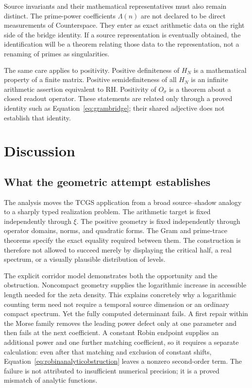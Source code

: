 \documentclass[11pt,letterpaper]{article}
\numberwithin{equation}{section}
\theoremstyle{definition}
\theoremstyle{remark}
\begin{document}
Source invariants and their mathematical representatives must also remain distinct. The prime-power coefficients $\Lambda(n)$ are not declared to be direct measurements of Counterspace. They enter as exact arithmetic data on the right side of the bridge identity. If a source representation is eventually obtained, the identification will be a theorem relating those data to the representation, not a renaming of primes as singularities.

The same care applies to positivity. Positive definiteness of $H_N$ is a mathematical property of a finite matrix. Positive semidefiniteness of all $H_N$ is an infinite arithmetic assertion equivalent to RH. Positivity of $O_\sigma$ is a theorem about a closed readout operator. These statements are related only through a proved identity such as Equation~\eqref{eq:grambridge}; their shared adjective does not establish that identity.

\section{Discussion}
\label{sec:discussion}
\subsection{What the geometric attempt establishes}
The analysis moves the TCGS application from a broad source--shadow analogy to a sharply typed realization problem. The arithmetic target is fixed independently through $\xi$. The positive geometry is fixed independently through operator domains, norms, and quadratic forms. The Gram and prime-trace theorems specify the exact equality required between them. The construction is therefore not allowed to succeed merely by displaying the critical half, a real spectrum, or a visually plausible distribution of levels.

The explicit corridor model demonstrates both the opportunity and the obstruction. Noncompact geometry supplies the logarithmic increase in accessible length needed for the zeta density. This explains concretely why a logarithmic counting term need not require a temporal source dimension or an ordinary compact spectrum. Yet the fully computed determinant fails. A first repair within the Morse family removes the leading power defect only at one parameter and then fails at the next coefficient. A constant Robin endpoint supplies an additional power and one further matching coefficient, so it requires a separate calculation: even after that matching and exclusion of constant shifts, Equation~\eqref{eq:robinanalyticobstruction} leaves a nonzero second-order term. The failure is not attributed to insufficient numerical precision; it is a proved mismatch of analytic functions.
\end{document}
